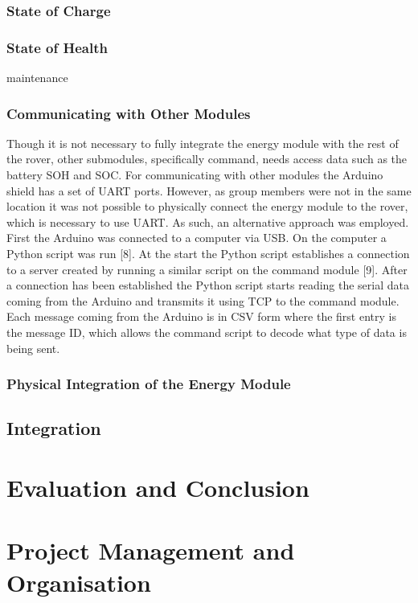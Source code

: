 \documentclass[a4paper]{article}
\begin{document}
\subsubsection{State of Charge}

\subsubsection{State of Health}
maintenance

\subsubsection{Communicating with Other Modules}
Though it is not necessary to fully integrate the energy module with the rest of the rover, other submodules, specifically command, needs access data such as the battery SOH and SOC. For communicating with other modules the Arduino shield has a set of UART ports. However, as group members were not in the same location it was not possible to physically connect the energy module to the rover, which is necessary to use UART. As such, an alternative approach was employed. First the Arduino was connected to a computer via USB. On the computer a Python script was run [8]. At the start the Python script establishes a connection to a server created by running a similar script on the command module [9]. After a connection has been established the Python script starts reading the serial data coming from the Arduino and transmits it using TCP to the command module. Each message coming from the Arduino is in CSV form where the first entry is the message ID, which allows the command script to decode what type of data is being sent. 

\subsubsection{Physical Integration of the Energy Module}


\subsection{Integration}



\section{Evaluation and Conclusion}

\section{Project Management and Organisation}
\end{document}

